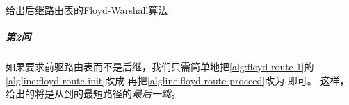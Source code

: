 \documentclass{dreamClass}
\begin{document}
\begin{algorithm}
    \caption{给出后继路由表的Floyd-Warshall算法}\label{alg:floyd-route-1}
    \Indm
    \Indp

     {
         {
             {
            }
        }
    }
\end{algorithm}
\subparagraph*{第2问}
如果要求前驱路由表而不是后继，我们只需简单地把\cref{alg:floyd-route-1}的\cref{algline:floyd-route-init}改成
再把\cref{algline:floyd-route-proceed}改为
即可。
这样，给出的将是从到的最短路径的\emph{最后一跳}。
\end{document}
